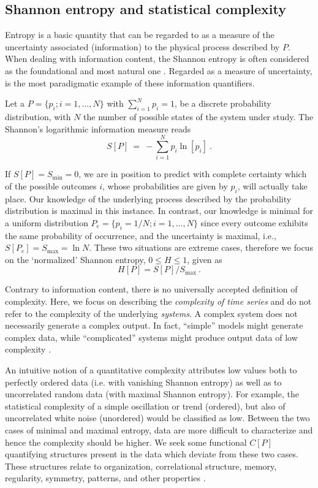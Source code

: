 \subsection{Shannon entropy and statistical complexity}

Entropy is a basic quantity that can be regarded to as a measure of the uncertainty associated (information) to the physical process described by $P$.
When dealing with information content, the Shannon entropy is often considered as the foundational and most natural one \cite{Shannon1948}.
Regarded as a measure of uncertainty, is the most paradigmatic example of these information quantifiers.

Let a $P=\{p_i; i=1,\ldots, N\}$ with $\sum_{i=1}^N p_i = 1$, be a discrete probability distribution, with $N$ the number of possible states of the system under study.
The Shannon's logarithmic information measure reads
\begin{equation}
\label{Shannon-disc}
S[P] ~=~ -\sum_{i=1}^{N} p_i \ln \left[ p_i \right] \ .
\end{equation}

If $S[P] = S_{\min} = 0$, we are in position to predict with complete certainty which of the possible outcomes $i$, whose probabilities are given by $p_i$, will actually take place. 
Our knowledge of the underlying process described by the probability distribution is maximal in this instance. 
In contrast, our knowledge is minimal for a uniform distribution $P_e = \{ p_i = 1/N; i=1, \ldots , N \}$ since every outcome exhibits the same probability of occurrence, and the uncertainty is maximal, i.e., $S[P_e] = S_{\max} = \ln N$.
These two situations are extreme cases, therefore we focus on the `normalized' Shannon entropy, $0 \leq H \leq 1$, given as
\begin{equation}
\label{shannon-disc-normalizada}
H[P] = S[P] / S_{\max} \ .
\end{equation}

Contrary to information content, there is no universally accepted definition of complexity.
Here, we focus on describing the \textit{complexity of time series} and do not refer to the complexity of the underlying \textit{systems}.
A complex system does not necessarily generate a complex output.
In fact, “simple” models might generate complex data, while “complicated” systems might produce output data of low complexity \cite{Kantz1998}.

An intuitive notion of a quantitative complexity attributes low values both to perfectly ordered data (i.e. with vanishing Shannon entropy) as well as to uncorrelated random data (with maximal Shannon entropy).
For example, the statistical complexity of a simple oscillation or trend (ordered), but also of uncorrelated white noise (unordered) would be classified as low.
Between the two cases of minimal and maximal entropy, data are more difficult to characterize and hence the complexity should be higher.
We seek some functional $C[P]$ quantifying structures present in the data which deviate from these two cases.
These structures relate to organization, correlational structure, memory, regularity, symmetry, patterns, and other properties \cite{Feldman2008}.

